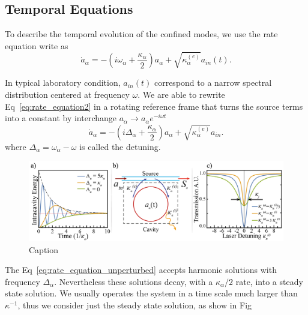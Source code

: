 \subsection{Temporal Equations}

To describe the temporal evolution of the confined modes, we use the rate equation write as 
\begin{equation}
    \dot{a}_\alpha = -\left(i\omega_\alpha +\frac{\kappa_\alpha}{2}\right)a_\alpha +\sqrt{\kappa^{(e)}_\alpha}a_{in}(t).
    \label{eq:rate_equation2}
\end{equation} 

In typical laboratory condition, $a_{in}(t)$ correspond to a narrow spectral distribution centered at frequency $\omega$. We are able to rewrite Eq~\ref{eq:rate_equation2} in a rotating reference frame that turns the source terms into a constant by interchange $a_\alpha \rightarrow a_\alpha e^{-i\omega t}$
\begin{equation}
    \dot{a}_\alpha = -\left(i\Delta_\alpha +\frac{\kappa_\alpha}{2}\right)a_\alpha +\sqrt{\kappa^{(e)}_\alpha}a_{in}.
    \label{eq:rate_equation_unperturbed}
\end{equation}
where $\Delta_\alpha = \omega_\alpha - \omega$ is called the detuning.
\begin{figure}[t!]
    \centering
    \includegraphics[width = 16cm]{Dissertation_rate_equation.jpg}
    \caption{Caption}
    \label{fig:rate_equations_single_mode}
\end{figure}

The Eq~\ref{eq:rate_equation_unperturbed} accepts harmonic solutions with frequency $\Delta_\alpha$. Nevertheless these solutions decay, with a  $\kappa_\alpha/2$ rate, into a steady state solution. We usually operates the system in a time scale much larger than $\kappa^{-1}$, thus we consider just the steady state solution, as show in Fig~

